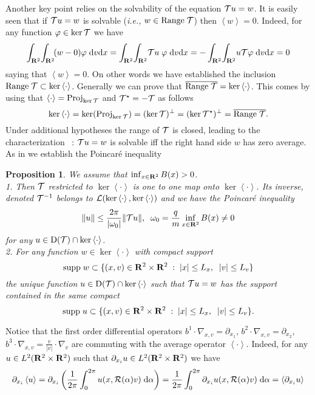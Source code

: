 \documentclass[12pt, a4paper]{article}
\providecommand\mathbb{\bf}
\newcommand\R{{\mathbb R}}
\newtheorem{pro}{Proposition}[section]
\newcommand{\intxv}[1]{
\int _{\R^2}\!\int _{\R^2} \!#1 \;\mathrm{d}v\mathrm{d}x}
\newcommand{\ran}[0]{
\mathrm{Range\;}}
\newcommand{\ltxv}[0]{
L^2(\R ^2 \times \R ^2)}
\newcommand{\nxv}[0]{
\nabla_{x,v}}
\newcommand{\ave}[1]{
\left \langle #1 \right \rangle }
\newcommand{\D}[0]{
\mathrm{D}}
\begin{document}
Another key point relies on the solvability of the equation ${\cal T}u = w$. It is easily seen that if ${\cal T} u = w $ is solvable ({\it i.e.,} $w \in \ran {\cal T}$) then $\ave{w} = 0$. Indeed, for any function $\varphi \in \ker {\cal T}$ we have
\[
\intxv{(w - 0) \varphi } = \intxv{{\cal T} u \;\varphi } = - \intxv{u {\cal T}\varphi} = 0
\]
saying that $\ave{w} = 0$. On other words we have established the inclusion $\ran {\cal T} \subset \ker \ave{\cdot}$. Generally we can prove that $\overline{\ran {\cal T}} = \ker \ave{\cdot}$. This comes by using  that $\ave{\cdot} = \mathrm{Proj}_{\ker {\cal T}}$ and ${\cal T} ^\star = - {\cal T}$ as follows
\[
\ker \ave{\cdot} = \ker (\mathrm{Proj}_{\ker {\cal T}}) =
(\ker {\cal T} )^\perp = (\ker {\cal T}^\star ) ^\perp = \overline{\ran {\cal T}}.
\]
Under additional hypotheses the range of ${\cal T}$ is closed, leading to the characterization ~: ${\cal T }u  = w$ is solvable iff the right hand side $w$ has zero average. As in \cite{BosGuidCent3D} we establish the Poincar\'e inequality
\begin{pro}
\label{TransportProp}
We assume that $\inf _{x \in \R ^2} B (x)  >0$. \\
1. Then ${\cal T}$ restricted to $\ker \ave{\cdot}$ is one to one map onto $\ker \ave{\cdot}$. Its inverse, denoted ${\cal T}^{-1}$  belongs to ${\cal L }(\ker \ave{\cdot}, \ker \ave{\cdot} )$ and we have the Poincar\'e inequality
\begin{equation}
\label{EquPoincare} \|u \| \leq \frac{2 \pi }{|\omega _0 |} \|{\cal T} u \|,\;\;\omega _0 = \frac{q}{m} \inf _{x \in \R ^2} B(x) \neq 0
\end{equation}
for any $u \in \D({\cal T}) \cap \ker \ave{\cdot}$.\\
2. For any function $w \in \ker \ave{\cdot}$ with compact support
\[
\mathrm{supp} \;w \subset \{ (x,v) \in \R ^2 \times \R^2 \;:\; |x| \leq L_x,\;\;|v| \leq L_v\}
\]
the unique function $u \in \D({\cal T}) \cap \ker \ave{\cdot}$ such that ${\cal T } u  = w$ has the support contained in the same compact
\[
\mathrm{supp} \; u \subset \{ (x,v) \in \R ^2 \times \R^2 \;:\; |x| \leq L_x,\;\;|v| \leq L_v\}.
\]
\end{pro}
Notice that the first order differential operators $b^1 \cdot \nxv = \partial _{x_1}$,  $b^2 \cdot \nxv = \partial _{x_2}$, $b^3 \cdot \nxv = \frac{v}{|v|} \cdot \nabla _v$ are commuting with the average operator $\ave{\cdot}$. Indeed, for any $u \in \ltxv{}$ such that $\partial _{x_i} u \in \ltxv{}$ we have
\[
\partial _{x_i} \ave{u} = \partial _{x_i}\left ( \frac{1}{2\pi} \int _0 ^{2\pi} u (x, {\cal R}(\alpha) v ) \;\mathrm{d}\alpha  \right ) =
\frac{1}{2\pi} \int _0 ^{2\pi} \partial _{x_i} u (x, {\cal R}(\alpha) v ) \;\mathrm{d}\alpha = \ave{\partial _{x_i} u }
\] 
\end{document}
